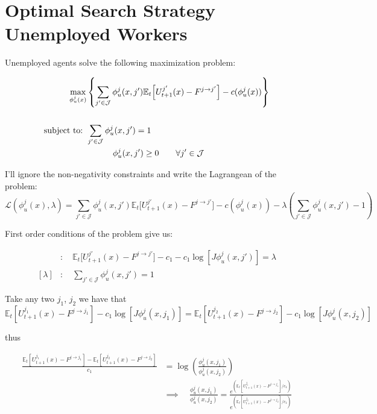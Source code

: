 \documentclass[
  letterpaper,
  DIV=11,
  numbers=noendperiod]{scrreprt}
\begin{document}
\cleardoublepage
{}
{}
\appendix

\hypertarget{sec-appendix_search_unemp}{%
\chapter{Optimal Search Strategy Unemployed
Workers}\label{sec-appendix_search_unemp}}

Unemployed agents solve the following maximization problem:

\begin{align*}
    \max_{\phi^j_u(x)}&\left\{ \sum_{j'\in\mathcal{J}}\phi^j_u(x, j')\mathbb{E}_t\Big[U^{j'}_{t+1}(x) - F^{j \to j'}  \Big] -c(\phi^j_u(x)) \right\} \\ \\
    \text{subject to: } & \sum_{j'\in \mathcal{J}}\phi^j_u(x, j') = 1 \\
    & \hspace{1.1 cm} \phi^j_u(x, j') \geq 0 \qquad \forall j'\in \mathcal{J}
\end{align*}

I'll ignore the non-negativity constraints and write the Lagrangean of
the problem:
\[\mathcal{L}(\phi^j_u(x), \lambda) =  \sum_{j'\in\mathcal{J}} \phi^j_u(x, j')\mathbb{E}_t\Big[U^{j'}_{t+1}(x) - F^{j \to j'}  \Big] -c(\phi^j_u(x)) - \lambda \left(\sum_{j'\in \mathcal{J}}\phi^j_u(x, j') - 1\right)\]

First order conditions of the problem give us:

\begin{align*}
  [\phi^j_u(x, j')] &:\quad \mathbb{E}_t\Big[U^{j'}_{t+1}(x) - F^{j \to j'}  \Big] - c_1 - c_1 \log[J \phi^j_u(x, j')] = \lambda \\
  [\lambda] &: \quad \sum_{j'\in \mathcal{J}}\phi^j_u(x, j') = 1
\end{align*}

Take any two \(j_1\), \(j_2\) we have that
\[\mathbb{E}_t\left[U^{j_1}_{t+1}(x) - F^{j \to j_1}  \right] - c_1 \log[J \phi^j_u(x, j_1)] = \mathbb{E}_t\left[U^{j_2}_{t+1}(x) - F^{j \to j_2}  \right] - c_1 \log[J \phi^j_u(x, j_2)]\]

thus

\begin{align*}
  \frac{\mathbb{E}_t\left[U^{j_1}_{t+1}(x) - F^{j \to j_1}\right] - \mathbb{E}_t\left[U^{j_2}_{t+1}(x) - F^{j \to j_2}\right]}{c_1} &= \log\left(\frac{ \phi^j_u(x, j_1)}{ \phi^j_u(x, j_2)}\right) \\ 
  &\implies \quad \frac{ \phi^j_u(x, j_1)}{ \phi^j_u(x, j_2)} = \frac{e^{\left(\mathbb{E}_t\left[U^{j_1}_{t+1}(x) - F^{j \to j_1}\right] /c_1\right)}}{e^{\left(\mathbb{E}_t\left[U^{j_2}_{t+1}(x) - F^{j \to j_2}\right] /c_1\right)}}
\end{align*}
\end{document}
